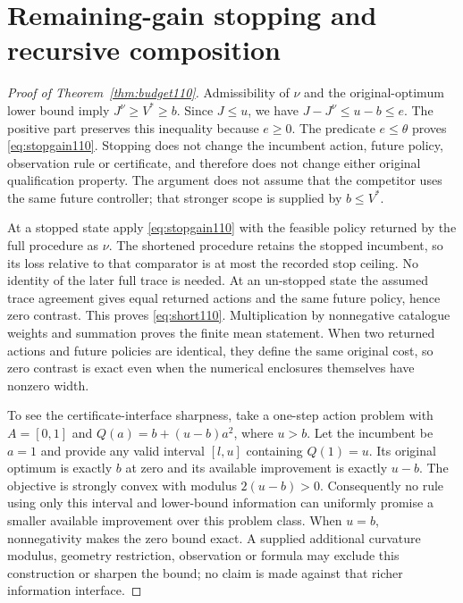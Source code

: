 \section{Remaining-gain stopping and recursive composition}\label{supp:budget110}
\begin{proof}[Proof of Theorem~\ref{thm:budget110}]
Admissibility of $\nu$ and the original-optimum lower bound imply
$J^\nu\ge V^*\ge b$. Since $J\le u$, we have $J-J^\nu\le u-b\le e$. The positive part preserves this inequality because $e\ge0$. The predicate $e\le\theta$ proves \eqref{eq:stopgain110}. Stopping does not change the incumbent action, future policy, observation rule or certificate, and therefore does not change either original qualification property. The argument does not assume that the competitor uses the same future controller; that stronger scope is supplied by $b\le V^*$.

At a stopped state apply \eqref{eq:stopgain110} with the feasible policy returned by the full procedure as $\nu$. The shortened procedure retains the stopped incumbent, so its loss relative to that comparator is at most the recorded stop ceiling. No identity of the later full trace is needed. At an un-stopped state the assumed trace agreement gives equal returned actions and the same future policy, hence zero contrast. This proves \eqref{eq:short110}. Multiplication by nonnegative catalogue weights and summation proves the finite mean statement. When two returned actions and future policies are identical, they define the same original cost, so zero contrast is exact even when the numerical enclosures themselves have nonzero width.

To see the certificate-interface sharpness, take a one-step action problem with $A=[0,1]$ and $Q(a)=b+(u-b)a^2$, where $u>b$. Let the incumbent be $a=1$ and provide any valid interval $[l,u]$ containing $Q(1)=u$. Its original optimum is exactly $b$ at zero and its available improvement is exactly $u-b$. The objective is strongly convex with modulus $2(u-b)>0$. Consequently no rule using only this interval and lower-bound information can uniformly promise a smaller available improvement over this problem class. When $u=b$, nonnegativity makes the zero bound exact. A supplied additional curvature modulus, geometry restriction, observation or formula may exclude this construction or sharpen the bound; no claim is made against that richer information interface.
\end{proof}

